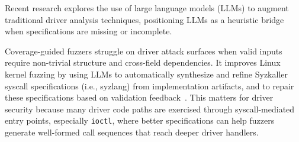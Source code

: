 Recent research explores the use of large language models (LLMs) to augment traditional driver analysis techniques, positioning LLMs as a heuristic bridge when specifications are missing or incomplete.

\textbf{}
Coverage-guided fuzzers struggle on driver attack surfaces when valid inputs require non-trivial structure and cross-field dependencies.
It improves Linux kernel fuzzing by using LLMs to automatically synthesize and refine Syzkaller syscall specifications (i.e., syzlang) from implementation artifacts, and to repair these specifications based on validation feedback~.
This matters for driver security because many driver code paths are exercised through syscall-mediated entry points, especially \texttt{ioctl}, where better specifications can help fuzzers generate well-formed call sequences that reach deeper driver handlers.

